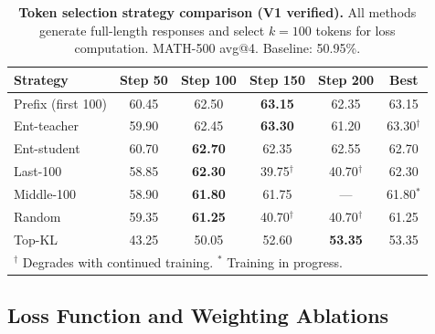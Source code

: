 \documentclass[10pt]{article}
\begin{document}
\begin{table}[!htbp]
\centering
\caption{\textbf{Token selection strategy comparison (V1 verified).} All methods generate full-length responses and select $k{=}100$ tokens for loss computation. MATH-500 avg@4. Baseline: 50.95\%.}
\label{tab:app_token_select}
\small
\begin{tabular}{l cccc c}
\toprule
\textbf{Strategy} & \textbf{Step 50} & \textbf{Step 100} & \textbf{Step 150} & \textbf{Step 200} & \textbf{Best} \\
\midrule
Prefix (first 100) & 60.45 & 62.50 & \textbf{63.15} & 62.35 & 63.15 \\
Ent-teacher & 59.90 & 62.45 & \textbf{63.30} & 61.20 & 63.30$^\dag$ \\
Ent-student & 60.70 & \textbf{62.70} & 62.35 & 62.55 & 62.70 \\
Last-100 & 58.85 & \textbf{62.30} & 39.75$^\dag$ & 40.70$^\dag$ & 62.30 \\
Middle-100 & 58.90 & \textbf{61.80} & 61.75 & --- & 61.80$^*$ \\
Random & 59.35 & \textbf{61.25} & 40.70$^\dag$ & 40.70$^\dag$ & 61.25 \\
Top-KL & 43.25 & 50.05 & 52.60 & \textbf{53.35} & 53.35 \\
\bottomrule
\multicolumn{6}{l}{\footnotesize $^\dag$ Degrades with continued training. $^*$ Training in progress.}
\end{tabular}
\end{table}


\subsection{Loss Function and Weighting Ablations}
\label{app:loss_ablation}
\end{document}
